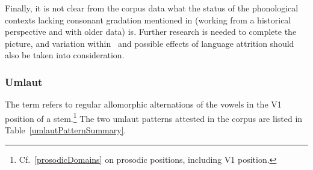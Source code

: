 Finally, it is not clear from the corpus data what the status of the phonological contexts lacking consonant gradation mentioned in \citet[21]{Sammallahti1998} (working from a historical perspective and with older data) is. Further research is needed to complete the picture, and %
variation within \PS\ and possible effects of language attrition should also be taken into consideration.



\subsubsection{Umlaut}\label{umlaut}
The term  refers to regular allomorphic alternations of the vowels in the V1 position of a stem.\footnote{Cf.~\SEC\ref{prosodicDomains} on prosodic positions, including V1 position.} 
The two umlaut patterns attested in the corpus are listed in Table~\vref{umlautPatternSummary}. %
